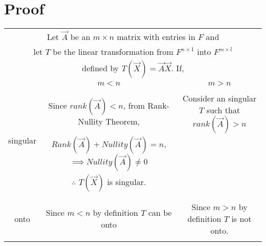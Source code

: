 \documentclass[journal,12pt,twocolumn]{IEEEtran}
\begin{document}
\section{Proof}
\begin{table}[hp]
	\begin{center}
	\begin{adjustbox}{width=1\textwidth}
		\begin{tabular}{|c|c|c|}			
			\hline
			\multicolumn{3}{|c|}{Let $\vec{A}$ be an $m \times n$ matrix with entries in $F$ and}\\
			\multicolumn{3}{|c|}{let $T$ be the linear transformation from $F^{n \times1 }$ into $F^{m \times l}$}\\
			\multicolumn{3}{|c|}{defined by $T(\vec{X}) = \vec{A}\vec{X}$. If,}\\			
			\hline
			& \multicolumn{1}{|c|}{$m < n$} & \multicolumn{1}{c|}{$m > n$}\\
			\hline
			\multirow{4}{*}{singular} & &\\
			& Since $rank(\vec{A})<n$, from Rank-Nullity Theorem, & Consider an singular $T$ such that $rank(\vec{A}) > n$\\
			& $Rank(\vec{A}) + Nullity(\vec{A}) = n$, $\implies Nullity(\vec{A}) \neq 0$ & \\
			& $\therefore$ $T(\vec{X})$ is singular. & \\
			&  & \\
			\hline
			\multirow{3}{*}{onto} & &\\
			& Since $m<n$ by definition $T$ can be onto & Since $m>n$ by definition $T$ is not onto.\\
			& &\\
			\hline
			\end{tabular}
			\end{adjustbox}
	\end{center}
\end{table}
\end{document}
